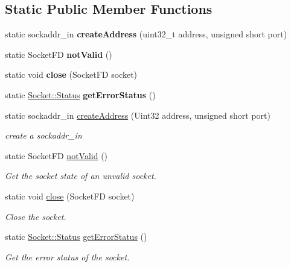 \subsection*{Static Public Member Functions}
\begin{DoxyCompactItemize}
\item 
\hypertarget{classmognetwork_1_1_os_socket_aec3ee68397d04abab9003ddd68e86793}{static sockaddr\-\_\-in {\bfseries create\-Address} (uint32\-\_\-t address, unsigned short port)}\label{classmognetwork_1_1_os_socket_aec3ee68397d04abab9003ddd68e86793}

\item 
\hypertarget{classmognetwork_1_1_os_socket_a5b2cf6583d7bc3a640a162a6ae3dead7}{static Socket\-F\-D {\bfseries not\-Valid} ()}\label{classmognetwork_1_1_os_socket_a5b2cf6583d7bc3a640a162a6ae3dead7}

\item 
\hypertarget{classmognetwork_1_1_os_socket_afc41f453da34be5cce9fa5470ca3697a}{static void {\bfseries close} (Socket\-F\-D socket)}\label{classmognetwork_1_1_os_socket_afc41f453da34be5cce9fa5470ca3697a}

\item 
\hypertarget{classmognetwork_1_1_os_socket_a331f63335ee89ae3eaa24a59cbada192}{static \hyperlink{classmognetwork_1_1_socket_aa187a8394ac0d6203af0ec7f021ca15f}{Socket\-::\-Status} {\bfseries get\-Error\-Status} ()}\label{classmognetwork_1_1_os_socket_a331f63335ee89ae3eaa24a59cbada192}

\item 
static sockaddr\-\_\-in \hyperlink{classmognetwork_1_1_os_socket_ae012b09d94070d07925a03cdc3a8a6ae}{create\-Address} (Uint32 address, unsigned short port)
\begin{DoxyCompactList}\small\item\em create a sockaddr\-\_\-in \end{DoxyCompactList}\item 
static Socket\-F\-D \hyperlink{classmognetwork_1_1_os_socket_a5b2cf6583d7bc3a640a162a6ae3dead7}{not\-Valid} ()
\begin{DoxyCompactList}\small\item\em Get the socket state of an unvalid socket. \end{DoxyCompactList}\item 
static void \hyperlink{classmognetwork_1_1_os_socket_afc41f453da34be5cce9fa5470ca3697a}{close} (Socket\-F\-D socket)
\begin{DoxyCompactList}\small\item\em Close the socket. \end{DoxyCompactList}\item 
static \hyperlink{classmognetwork_1_1_socket_aa187a8394ac0d6203af0ec7f021ca15f}{Socket\-::\-Status} \hyperlink{classmognetwork_1_1_os_socket_a331f63335ee89ae3eaa24a59cbada192}{get\-Error\-Status} ()
\begin{DoxyCompactList}\small\item\em Get the error status of the socket. \end{DoxyCompactList}\end{DoxyCompactItemize}


